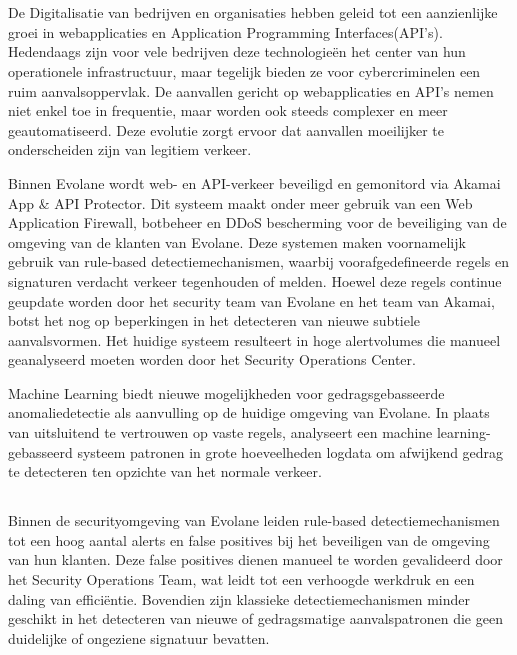 
\chapter{}%
\label{ch:inleiding}

De Digitalisatie van bedrijven en organisaties hebben geleid tot een aanzienlijke groei in webapplicaties en Application Programming Interfaces(API's). Hedendaags zijn voor vele bedrijven deze technologieën het center van hun operationele infrastructuur, maar tegelijk bieden ze voor cybercriminelen een ruim aanvalsoppervlak. De aanvallen gericht op webapplicaties en API's nemen niet enkel toe in frequentie, maar worden ook steeds complexer en meer geautomatiseerd. Deze evolutie zorgt ervoor dat aanvallen moeilijker te onderscheiden zijn van legitiem verkeer. 

Binnen Evolane wordt web- en API-verkeer beveiligd en gemonitord via Akamai App & API Protector. Dit systeem maakt onder meer gebruik van een Web Application Firewall, botbeheer en DDoS bescherming voor de beveiliging van de omgeving van de klanten van Evolane. Deze systemen maken voornamelijk gebruik van rule-based detectiemechanismen, waarbij voorafgedefineerde regels en signaturen verdacht verkeer tegenhouden of melden. Hoewel deze regels continue geupdate worden door het security team van Evolane en het team van Akamai, botst het nog op beperkingen in het detecteren van nieuwe subtiele aanvalsvormen. Het huidige systeem resulteert in hoge alertvolumes die manueel geanalyseerd moeten worden door het Security Operations Center. 

Machine Learning biedt nieuwe mogelijkheden voor gedragsgebasseerde anomaliedetectie als aanvulling op de huidige omgeving van Evolane. In plaats van uitsluitend te vertrouwen op vaste regels, analyseert een machine learning-gebasseerd systeem patronen in grote hoeveelheden logdata om afwijkend gedrag te detecteren ten opzichte van het normale verkeer. 


\section{}%
\label{sec:probleemstelling}

Binnen de securityomgeving van Evolane leiden rule-based detectiemechanismen tot een hoog aantal alerts en false positives bij het beveiligen van de omgeving van hun klanten. Deze false positives dienen manueel te worden gevalideerd door het Security Operations Team, wat leidt tot een verhoogde werkdruk en een daling van efficiëntie. Bovendien zijn klassieke detectiemechanismen minder geschikt in het detecteren van nieuwe of gedragsmatige aanvalspatronen die geen duidelijke of ongeziene signatuur bevatten. 

